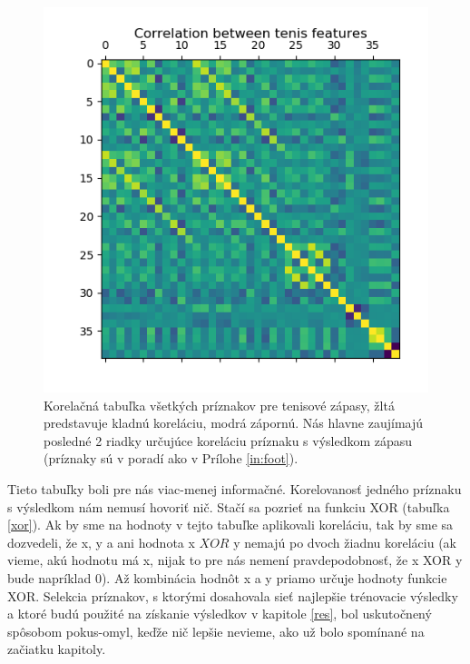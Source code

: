 \begin{figure} [h!]
\includegraphics[scale=0.9]{../img/corratp.png}
\caption{Korelačná tabuľka všetkých príznakov pre tenisové zápasy, žltá predstavuje kladnú koreláciu, modrá zápornú. Nás hlavne zaujímajú posledné 2 riadky určujúce koreláciu príznaku s výsledkom zápasu (príznaky sú v poradí ako v Prílohe \ref{in:foot}).}
\label{corr_atp}
\end{figure}

Tieto tabuľky boli pre nás viac-menej informačné.
Korelovanosť jedného príznaku s výsledkom nám nemusí hovoriť nič.
Stačí sa pozrieť na funkciu XOR (tabuľka \ref{xor}). Ak by sme na hodnoty v tejto tabuľke aplikovali koreláciu, tak by sme sa dozvedeli, že x, y a ani hodnota x $XOR$ y nemajú po dvoch žiadnu koreláciu (ak vieme, akú hodnotu má x, nijak to pre nás nemení pravdepodobnosť, že x XOR y bude napríklad 0). Až kombinácia hodnôt x a y priamo určuje hodnoty funkcie XOR.
Selekcia príznakov, s ktorými dosahovala sieť najlepšie trénovacie výsledky a ktoré budú použité na získanie výsledkov v kapitole \ref{res}, bol uskutočnený spôsobom pokus-omyl, keďže nič lepšie nevieme, ako už bolo spomínané na začiatku kapitoly.


